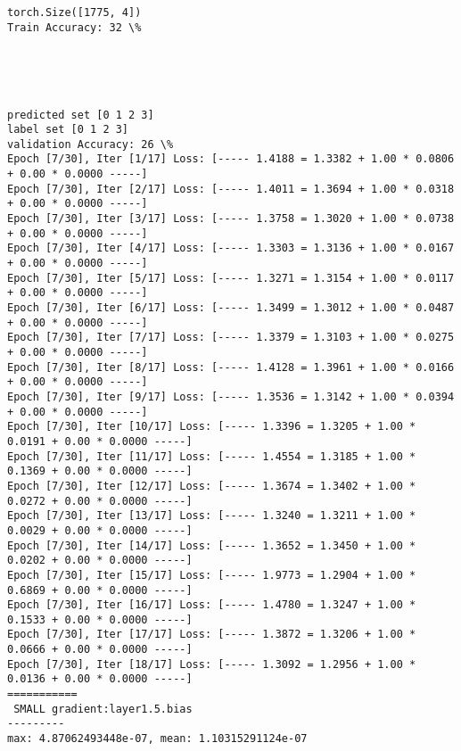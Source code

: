 \documentclass[11pt]{article}
\begin{document}
    \begin{Verbatim}[commandchars=\\\{\}]
torch.Size([1775, 4])
Train Accuracy: 32 \%

    \end{Verbatim}

    \begin{center}
    \end{center}
    { \hspace*{\fill} \\}
    
    \begin{center}
    \end{center}
    { \hspace*{\fill} \\}
    
    \begin{Verbatim}[commandchars=\\\{\}]
predicted set [0 1 2 3]
label set [0 1 2 3]
validation Accuracy: 26 \%
Epoch [7/30], Iter [1/17] Loss: [----- 1.4188 = 1.3382 + 1.00 * 0.0806 + 0.00 * 0.0000 -----]
Epoch [7/30], Iter [2/17] Loss: [----- 1.4011 = 1.3694 + 1.00 * 0.0318 + 0.00 * 0.0000 -----]
Epoch [7/30], Iter [3/17] Loss: [----- 1.3758 = 1.3020 + 1.00 * 0.0738 + 0.00 * 0.0000 -----]
Epoch [7/30], Iter [4/17] Loss: [----- 1.3303 = 1.3136 + 1.00 * 0.0167 + 0.00 * 0.0000 -----]
Epoch [7/30], Iter [5/17] Loss: [----- 1.3271 = 1.3154 + 1.00 * 0.0117 + 0.00 * 0.0000 -----]
Epoch [7/30], Iter [6/17] Loss: [----- 1.3499 = 1.3012 + 1.00 * 0.0487 + 0.00 * 0.0000 -----]
Epoch [7/30], Iter [7/17] Loss: [----- 1.3379 = 1.3103 + 1.00 * 0.0275 + 0.00 * 0.0000 -----]
Epoch [7/30], Iter [8/17] Loss: [----- 1.4128 = 1.3961 + 1.00 * 0.0166 + 0.00 * 0.0000 -----]
Epoch [7/30], Iter [9/17] Loss: [----- 1.3536 = 1.3142 + 1.00 * 0.0394 + 0.00 * 0.0000 -----]
Epoch [7/30], Iter [10/17] Loss: [----- 1.3396 = 1.3205 + 1.00 * 0.0191 + 0.00 * 0.0000 -----]
Epoch [7/30], Iter [11/17] Loss: [----- 1.4554 = 1.3185 + 1.00 * 0.1369 + 0.00 * 0.0000 -----]
Epoch [7/30], Iter [12/17] Loss: [----- 1.3674 = 1.3402 + 1.00 * 0.0272 + 0.00 * 0.0000 -----]
Epoch [7/30], Iter [13/17] Loss: [----- 1.3240 = 1.3211 + 1.00 * 0.0029 + 0.00 * 0.0000 -----]
Epoch [7/30], Iter [14/17] Loss: [----- 1.3652 = 1.3450 + 1.00 * 0.0202 + 0.00 * 0.0000 -----]
Epoch [7/30], Iter [15/17] Loss: [----- 1.9773 = 1.2904 + 1.00 * 0.6869 + 0.00 * 0.0000 -----]
Epoch [7/30], Iter [16/17] Loss: [----- 1.4780 = 1.3247 + 1.00 * 0.1533 + 0.00 * 0.0000 -----]
Epoch [7/30], Iter [17/17] Loss: [----- 1.3872 = 1.3206 + 1.00 * 0.0666 + 0.00 * 0.0000 -----]
Epoch [7/30], Iter [18/17] Loss: [----- 1.3092 = 1.2956 + 1.00 * 0.0136 + 0.00 * 0.0000 -----]
===========
 SMALL gradient:layer1.5.bias
---------
max: 4.87062493448e-07, mean: 1.10315291124e-07

    \end{Verbatim}
\end{document}
